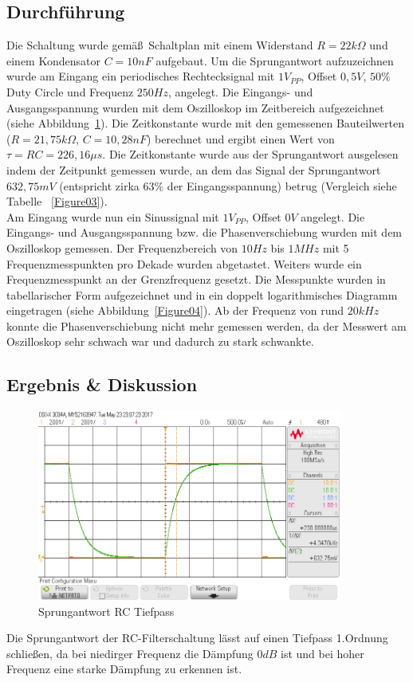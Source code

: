 \documentclass[12pt,a4paper,titlepage]{article}
\begin{document}
\subsection{Durchf\"uhrung}
Die Schaltung wurde gem\"a\ss\, Schaltplan mit einem Widerstand $R=22k\Omega$ und einem Kondensator $C=10nF$ aufgebaut. Um die Sprungantwort aufzuzeichnen wurde am Eingang ein periodisches Rechtecksignal mit $1 V_{PP}$, Offset $0,5 V$, $50 \%$ Duty Circle und Frequenz $250 Hz$, angelegt. Die Eingangs- und Ausgangsspannung wurden mit dem Oszilloskop im Zeitbereich aufgezeichnet (siehe Abbildung~\ref{Figure02}). Die Zeitkonstante wurde mit den gemessenen Bauteilwerten ($R=21,75 k\Omega$, $C=10,28nF$) berechnet und ergibt einen Wert von $\tau = RC = 226,16 \mu s$. Die Zeitkonstante wurde aus der Sprungantwort ausgelesen indem der Zeitpunkt gemessen wurde, an dem das Signal der Sprungantwort $632,75 mV$ (entspricht zirka $63 \%$ der Eingangsspannung) betrug (Vergleich siehe Tabelle ~\ref{Figure03}). \\
Am Eingang wurde nun ein Sinussignal mit $1 V_{PP}$, Offset $0 V$ angelegt. Die Eingangs- und Ausgangsspannung bzw. die Phasenverschiebung wurden mit dem Oszilloskop gemessen. Der Frequenzbereich von $10Hz$ bis $1MHz$ mit 5 Frequenzmesspunkten pro Dekade wurden abgetastet. Weiters wurde ein Frequenzmesspunkt an der Grenzfrequenz gesetzt. Die Messpunkte wurden in tabellarischer Form aufgezeichnet und in ein doppelt logarithmisches Diagramm eingetragen (siehe Abbildung~\ref{Figure04}). Ab der Frequenz von rund $20kHz$ konnte die Phasenverschiebung nicht mehr gemessen werden, da der Messwert am Oszilloskop sehr schwach war und dadurch zu stark schwankte.

\subsection{Ergebnis \& Diskussion}
\begin{figure}[H]
  \centering
  \includegraphics[width=100mm]{sprungantwort_rc_tiefpass.png}
  \caption{Sprungantwort RC Tiefpass}
  \label{Figure02}
\end{figure}
\noindent Die Sprungantwort der RC-Filterschaltung l\"asst auf einen Tiefpass 1.Ordnung schlie\ss en, da bei niedirger Frequenz die D\"ampfung $0dB$ ist und bei hoher Frequenz eine starke D\"ampfung zu erkennen ist.
\end{document}
